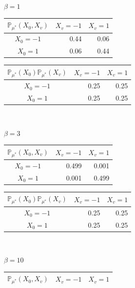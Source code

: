 \documentclass[12pt]{article}
\begin{document}
\begin{table}[h]
    \raggedright
    $\beta=1$\\
    \centering
    \begin{tabular}{c|rr}
        $\mathbb{P}_{\mu^*}(X_0, X_v)$ & \multicolumn{1}{c}{$X_v=-1$} & \multicolumn{1}{c}{$X_v=1$} \\ \hline
        $X_0=-1$                       & 0.44                         & 0.06                        \\
        $X_0=1$                        & 0.06                         & 0.44
    \end{tabular}
    \quad\quad
    \begin{tabular}{c|rr}
        $\mathbb{P}_{\mu^*}(X_0)\mathbb{P}_{\mu^*}(X_v)$ & \multicolumn{1}{c}{$X_v=-1$} & \multicolumn{1}{c}{$X_v=1$} \\ \hline
        $X_0=-1$                                         & 0.25                         & 0.25                        \\
        $X_0=1$                                          & 0.25                         & 0.25
    \end{tabular} \\
    \raggedright
    $\beta=3$\\
    \centering
    \begin{tabular}{c|rr}
        $\mathbb{P}_{\mu^*}(X_0, X_v)$ & \multicolumn{1}{c}{$X_v=-1$} & \multicolumn{1}{c}{$X_v=1$} \\ \hline
        $X_0=-1$                       & 0.499                        & 0.001                       \\
        $X_0=1$                        & 0.001                        & 0.499
    \end{tabular}
    \quad\quad
    \begin{tabular}{c|rr}
        $\mathbb{P}_{\mu^*}(X_0)\mathbb{P}_{\mu^*}(X_v)$ & \multicolumn{1}{c}{$X_v=-1$} & \multicolumn{1}{c}{$X_v=1$} \\ \hline
        $X_0=-1$                                         & 0.25                         & 0.25                        \\
        $X_0=1$                                          & 0.25                         & 0.25
    \end{tabular} \\
    \raggedright
    $\beta=10$\\
    \centering
    \begin{tabular}{c|rr}
        $\mathbb{P}_{\mu^*}(X_0, X_v)$ & \multicolumn{1}{c}{$X_v=-1$} & \multicolumn{1}{c}{$X_v=1$} \\ \hline

\end{tabular}
\end{table}
\end{document}
